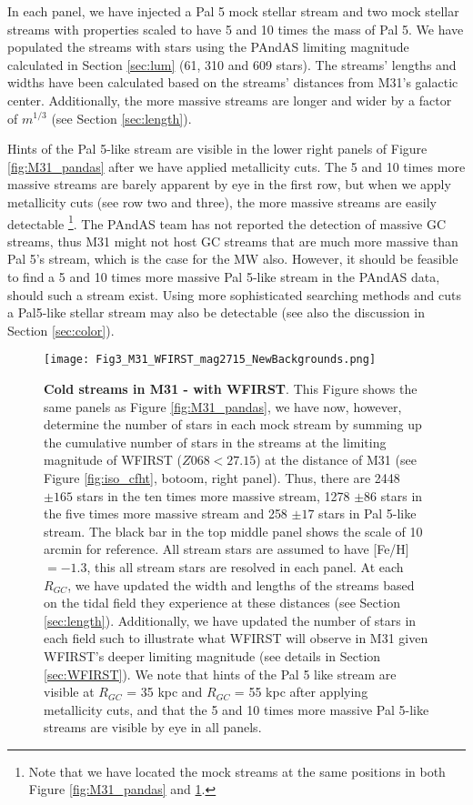 \documentclass[twocolumn]{aastex62}
\begin{document}
In each panel, we have injected a Pal 5 mock stellar stream and two mock stellar streams with properties scaled to have 5 and 10 times the mass of Pal 5. We have populated the streams with stars using the PAndAS limiting magnitude calculated in Section \ref{sec:lum} (61, 310 and 609 stars).  The streams' lengths and widths have been calculated based on the streams' distances from M31's galactic center. Additionally, the more massive streams are longer and wider by a factor of $m^{1/3}$ (see Section \ref{sec:length}). 

Hints of the Pal 5-like stream are visible in the lower right panels of Figure \ref{fig:M31_pandas} after we have applied metallicity cuts. The 5 and 10 times more massive streams are barely apparent by eye in the first row, but when we apply metallicity cuts (see row two and three), the more massive streams are easily detectable \footnote{Note that we have located the mock streams at the same positions in both Figure \ref{fig:M31_pandas} and \ref{fig:M31_wfirst}.}. The PAndAS team has not reported the detection of massive GC streams, thus M31 might not host GC streams that are much more massive than Pal 5's stream, which is the case for the MW also. However, it should be feasible to find a 5 and 10 times more massive Pal 5-like stream in the PAndAS data, should such a stream exist. Using more sophisticated searching methods and cuts a Pal5-like stellar stream may also be detectable (see also the discussion in Section \ref{sec:color}).

\begin{figure*}
\centerline{\texttt{[image: Fig3\_M31\_WFIRST\_mag2715\_NewBackgrounds.png]}}
\caption{{\bf Cold streams in M31 - with WFIRST}.  This Figure shows the same panels as Figure \ref{fig:M31_pandas}, we have now, however, determine the number of stars in each mock stream by summing up the cumulative number of stars in the streams at the limiting magnitude of WFIRST ($Z068 < 27.15$) at the distance of M31 (see Figure \ref{fig:iso_cfht}, botoom, right panel). Thus, there are 2448 $\pm165$ stars in the ten times more massive stream, 1278 $\pm86$ stars in the five times more massive stream and 258 $\pm 17$ stars in Pal 5-like stream. The black bar in the top middle panel shows the scale of 10 arcmin for reference. All stream stars are assumed to have [Fe/H] $= -1.3$, this all stream stars are resolved in each panel. At each $R_{GC}$, we have updated the width and lengths of the streams based on the tidal field they experience at these distances (see Section \ref{sec:length}). Additionally, we have updated the number of stars in each field such to illustrate what WFIRST will observe in M31 given WFIRST's  deeper limiting magnitude (see details in Section \ref{sec:WFIRST}). 
We note that hints of the Pal 5 like stream are visible at $R_{GC}$ = 35 kpc and $R_{GC}$ = 55 kpc after applying metallicity cuts, and that the 5 and 10 times more massive Pal 5-like streams are visible by eye in all panels.}
\label{fig:M31_wfirst}
\end{figure*}
\end{document}
